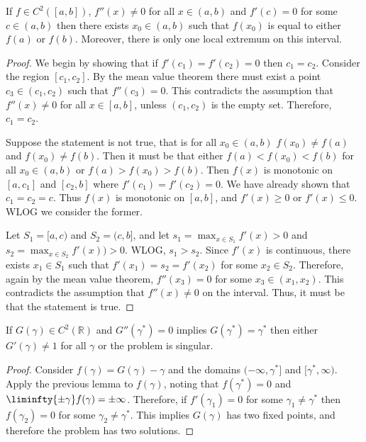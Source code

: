\documentclass{book}
\begin{document}
\begin{lemma}
If $f \in C^2([a,b])$, $f''(x) \neq 0$ for all $x \in (a,b)$ and $f'(c) = 0$ for some $c \in (a,b)$ then there exists $x_0 \in (a,b)$ such that $f(x_0)$ is equal to either $f(a)$ or $f(b)$.
Moreover, there is only one local extremum on this interval.
\end{lemma}

\begin{proof}
We begin by showing that if $f'(c_1) = f'(c_2) = 0$ then $c_1 = c_2$.
Consider the region $[c_1,c_2]$.
By the mean value theorem there must exist a point $c_3 \in (c_1,c_2)$ such that $f''(c_3) = 0$.
This contradicts the assumption that $f''(x) \neq 0$ for all $x \in [a,b]$, unless $(c_1,c_2)$ is the empty set.
Therefore, $c_1 = c_2$.

Suppose the statement is not true, that is for all $x_0 \in (a,b)$ $f(x_0) \neq f(a)$ and $f(x_0) \neq f(b)$.
Then it must be that either $f(a) < f(x_0) < f(b)$ for all $x_0 \in (a,b)$ or $f(a) > f(x_0) > f(b)$.
Then $f(x)$ is monotonic on $[a,c_1]$ and $[c_2,b]$ where $f'(c_1) = f'(c_2) = 0$.
We have already shown that $c_1 = c_2 = c$.
Thus $f(x)$ is monotonic on $[a,b]$, and $f'(x) \geq 0$ or $f'(x) \leq 0$.
WLOG we consider the former.

Let $S_1 = [a,c)$ and $S_2 = (c,b]$, and let $s_1 = \max_{x \in S_1} f'(x) > 0$ and $s_2 = \max_{x \in S_2} f'(x)) > 0$.
WLOG, $s_1 > s_2$.
Since $f'(x)$ is continuous, there exists $x_1 \in S_1$ such that $f'(x_1) = s_2 = f'(x_2)$ for some $x_2 \in S_2$.
Therefore, again by the mean value theorem, $f''(x_3) = 0$ for some $x_3 \in (x_1,x_2)$.
This contradicts the assumption that $f''(x) \neq 0$ on the interval.
Thus, it must be that the statement is true.
\end{proof}

\begin{cor}
If $G(\gamma) \in C^2(\mathbb{R})$ and $G''(\gamma^*) = 0$ implies $G(\gamma^*) = \gamma^*$ then either $G'(\gamma) \neq 1$ for all $\gamma$ or the problem is singular.
\end{cor}

\begin{proof}
Consider $f(\gamma) = G(\gamma) - \gamma$ and the domains $(-\infty,\gamma^*]$ and $[\gamma^*,\infty)$.
Apply the previous lemma to $f(\gamma)$, noting that $f(\gamma^*) = 0$ and $\liminfty{\pm \gamma} f(\gamma) = \pm \infty$.
Therefore, if $f'(\gamma_1) = 0$ for some $\gamma_1 \neq \gamma^*$ then $f(\gamma_2) = 0$ for some $\gamma_2 \neq \gamma^*$.
This implies $G(\gamma)$ has two fixed points, and therefore the problem has two solutions.
\end{proof}
\end{document}
